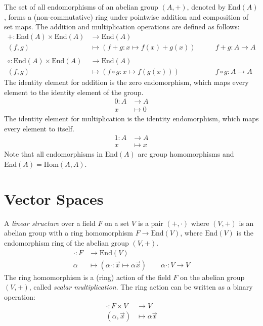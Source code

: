 \documentclass[11pt,fleqn]{book} %
\newcommand{\End}[1]{\text{End}(#1)} %
\newcommand{\Hom}[2]{\text{Hom}(#1, #2)} %
\begin{document}
\begin{definition}
    The set of all endomorphisms of an abelian group $(A, +)$, denoted by $\End{A}$, forms a (non-commutative) ring under pointwise addition and composition of set maps. The addition and multiplication operations are defined as follows:
    \[
        \begin{split}
            + : \End{A} \times \End{A} &\to \End{A} \\
            (f,g) &\mapsto (f+g: x \mapsto f(x) + g(x)) \qquad &f + g : A \to A \\ \\
            \circ : \End{A} \times \End{A} &\to \End{A} \\
            (f,g) &\mapsto (f \circ g: x \mapsto f(g(x))) \qquad &f \circ g : A \to A
        \end{split}
    \]
    The identity element for addition is the zero endomorphism, which maps every element to the identity element of the group. 
    \[ \begin{split}
        0: A &\to A \\
        x &\mapsto 0
    \end{split}
    \]
    The identity element for multiplication is the identity endomorphism, which maps every element to itself. 
    \[
    \begin{split}
        1: A &\to A \\
        x &\mapsto x
    \end{split}
    \]
    Note that all endomorphisms in $\End{A}$ are group homomorphisms and $\End{A} = \Hom{A}{A}$.
\end{definition}

\newpage

\section{Vector Spaces}

\begin{definition}
    A \emph{linear structure} over a field $F$ on a set $V$ is a pair $(+, \cdot)$ where $(V, +)$ is an abelian group with a ring homomorphism $F \to \End{V}$, where $\End{V}$ is the endomorphism ring of the abelian group $(V, +)$.
    \[ \begin{split}
            \cdot : F &\to \End{V} \\
            \alpha &\mapsto (\alpha\cdot : \vec{x} \mapsto \alpha \vec{x}) \qquad \alpha \cdot : V \to V
        \end{split}
    \]
    The ring homomorphism is a (ring) action of the field $F$ on the abelian group $(V, +)$, called \emph{scalar multiplication}. The ring action can be written as a binary operation:
    \[
        \begin{split}
            \cdot : F \times V &\to V \\
            (\alpha, \vec{x}) &\mapsto \alpha \vec{x}
        \end{split}
    \]
\end{definition}
\end{document}
